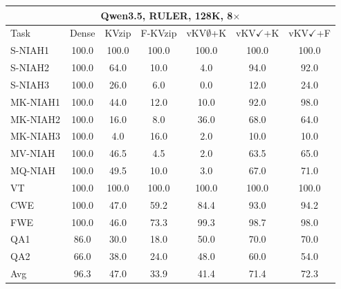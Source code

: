 \begin{tabular}{lcccccc}
\toprule
\multicolumn{7}{c}{Qwen3.5, RULER, 128K, 8$\times$} \\
\midrule
Task & Dense & KVzip & F-KVzip & vKV$\emptyset$+K & vKV$\checkmark$+K & vKV$\checkmark$+F \\
\midrule
S-NIAH1 & 100.0 & 100.0 & 100.0 & 100.0 & 100.0 & 100.0 \\
S-NIAH2 & 100.0 & 64.0 & 10.0 & 4.0 & 94.0 & 92.0 \\
S-NIAH3 & 100.0 & 26.0 & 6.0 & 0.0 & 12.0 & 24.0 \\
MK-NIAH1 & 100.0 & 44.0 & 12.0 & 10.0 & 92.0 & 98.0 \\
MK-NIAH2 & 100.0 & 16.0 & 8.0 & 36.0 & 68.0 & 64.0 \\
MK-NIAH3 & 100.0 & 4.0 & 16.0 & 2.0 & 10.0 & 10.0 \\
MV-NIAH & 100.0 & 46.5 & 4.5 & 2.0 & 63.5 & 65.0 \\
MQ-NIAH & 100.0 & 49.5 & 10.0 & 3.0 & 67.0 & 71.0 \\
VT & 100.0 & 100.0 & 100.0 & 100.0 & 100.0 & 100.0 \\
CWE & 100.0 & 47.0 & 59.2 & 84.4 & 93.0 & 94.2 \\
FWE & 100.0 & 46.0 & 73.3 & 99.3 & 98.7 & 98.0 \\
QA1 & 86.0 & 30.0 & 18.0 & 50.0 & 70.0 & 70.0 \\
QA2 & 66.0 & 38.0 & 24.0 & 48.0 & 60.0 & 54.0 \\
\midrule
Avg & 96.3 & 47.0 & 33.9 & 41.4 & 71.4 & 72.3 \\
\bottomrule
\end{tabular}
\vspace{0.8em}

